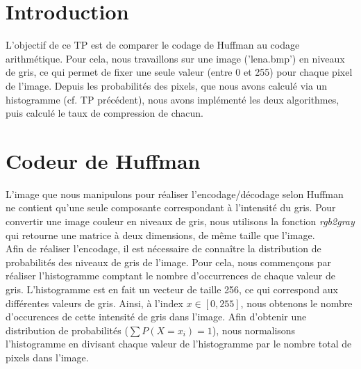 \documentclass[a4paper, 12pt]{article}
\begin{document}






\clearpage

\section{Introduction}
L'objectif de ce TP est de comparer le codage de Huffman au codage arithmétique. Pour cela, nous travaillons sur une image ('lena.bmp') en niveaux de gris, ce qui permet de fixer une seule valeur (entre 0 et 255) pour chaque pixel de l'image. Depuis les probabilités des pixels, que nous avons calculé via un histogramme (cf. TP précédent), nous avons implémenté les deux algorithmes, puis calculé le taux de compression de chacun.

\section{Codeur de Huffman}
L'image que nous manipulons pour réaliser l'encodage/décodage selon Huffman ne contient qu'une seule composante correspondant à l'intensité du gris. Pour convertir une image couleur en niveaux de gris, nous utilisons la fonction \textit{rgb2gray} qui retourne une matrice à deux dimensions, de même taille que l'image.\\

Afin de réaliser l'encodage, il est nécessaire de connaître la distribution de probabilités des niveaux de gris de l'image. Pour cela, nous commençons par réaliser l'histogramme comptant le nombre d'occurrences de chaque valeur de gris. L'histogramme est en fait un vecteur de taille 256, ce qui correspond aux différentes valeurs de gris. Ainsi, à l'index $x\in[0, 255]$, nous obtenons le nombre d'occurences de cette intensité de gris dans l'image. Afin d'obtenir une distribution de probabilités ($\sum P(X=x_{i}) = 1$), nous normalisons l'histogramme en divisant chaque valeur de l'histogramme par le nombre total de pixels dans l'image. \\
\end{document}
